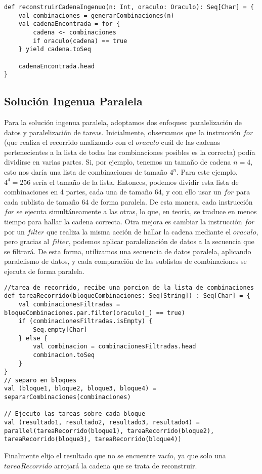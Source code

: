 \documentclass[conference]{IEEEtran}
\begin{document}
\begin{lstlisting}
def reconstruirCadenaIngenuo(n: Int, oraculo: Oraculo): Seq[Char] = {
    val combinaciones = generarCombinaciones(n)
    val cadenaEncontrada = for {
        cadena <- combinaciones
        if oraculo(cadena) == true
    } yield cadena.toSeq
    
    cadenaEncontrada.head
}
\end{lstlisting}

\subsection{\textbf{Solución Ingenua Paralela}}

Para la solución ingenua paralela, adoptamos dos enfoques: paralelización de datos y paralelización de tareas. Inicialmente, observamos que la instrucción $for$ (que realiza el recorrido analizando con el $oraculo$ cuál de las cadenas pertenecientes a la lista de todas las combinaciones posibles es la correcta) podía dividirse en varias partes. Si, por ejemplo, tenemos un tamaño de cadena $n=4$, esto nos daría una lista de combinaciones de tamaño $4^n$. Para este ejemplo, $4^4 = 256$ sería el tamaño de la lista. Entonces, podemos dividir esta lista de combinaciones en 4 partes, cada una de tamaño $64$, y con ello usar un $for$ para cada sublista de tamaño $64$ de forma paralela. De esta manera, cada instrucción $for$ se ejecuta simultáneamente a las otras, lo que, en teoría, se traduce en menos tiempo para hallar la cadena correcta. Otra mejora es cambiar la instrucción $for$ por un $filter$ que realiza la misma acción de hallar la cadena mediante el $oraculo$, pero gracias al $filter$, podemos aplicar paralelización de datos a la secuencia que se filtrará. De esta forma, utilizamos una secuencia de datos paralela, aplicando paralelismo de datos, y cada comparación de las sublistas de combinaciones se ejecuta de forma paralela.
\begin{lstlisting}
//tarea de recorrido, recibe una porcion de la lista de combinaciones
def tareaRecorrido(bloqueCombinaciones: Seq[String]) : Seq[Char] = {
    val combinacionesFiltradas = bloqueCombinaciones.par.filter(oraculo(_) == true)
    if (combinacionesFiltradas.isEmpty) {
        Seq.empty[Char] 
    } else {
        val combinacion = combinacionesFiltradas.head
        combinacion.toSeq
    }  
}
// separo en bloques
val (bloque1, bloque2, bloque3, bloque4) = separarCombinaciones(combinaciones)

// Ejecuto las tareas sobre cada bloque
val (resultado1, resultado2, resultado3, resultado4) = parallel(tareaRecorrido(bloque1), tareaRecorrido(bloque2), tareaRecorrido(bloque3), tareaRecorrido(bloque4))
\end{lstlisting}
Finalmente elijo el resultado que no se encuentre vacío, ya que solo una $tareaRecorrido$ arrojará la cadena que se trata de reconstruir.
\end{document}
